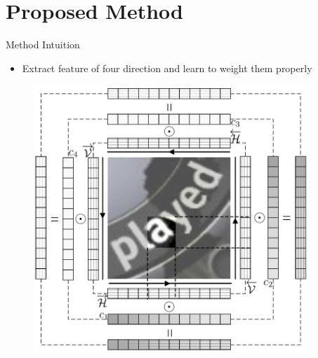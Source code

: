\documentclass[compress]{beamer}
\begin{document}
\section{Proposed Method}
\begin{frame}{Method Intuition}
    \begin{itemize}
        \item Extract feature of four direction and learn to weight them properly
    \end{itemize}
    \begin{figure}
        \includegraphics[width=.6\textheight]{method_intuition}
    \end{figure}
\end{frame}
\end{document}
